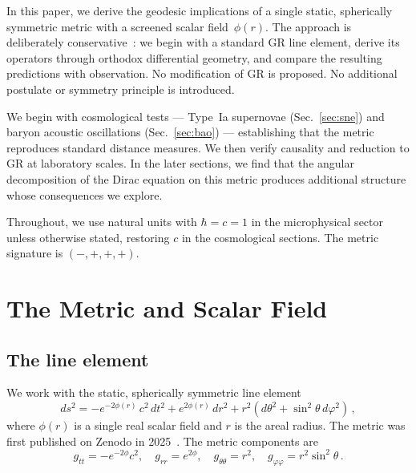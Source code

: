 \documentclass[aps,prd,twocolumn,superscriptaddress,nofootinbib,longbibliography]{revtex4-2}
\begin{document}
In this paper, we derive the geodesic implications of a single static,
spherically symmetric metric with a screened scalar field~$\phi(r)$.
The approach is deliberately conservative~\cite{Einstein1916,BransDicke1961,Fujii2003,Sotiriou2010}: we begin with a standard GR
line element, derive its operators through orthodox differential
geometry, and compare the resulting predictions with observation.  No
modification of GR is proposed.  No additional postulate or symmetry
principle is introduced.

We begin with cosmological tests --- Type~Ia supernovae
(Sec.~\ref{sec:sne}) and baryon acoustic oscillations
(Sec.~\ref{sec:bao}) --- establishing that the metric reproduces
standard distance measures.  We then verify causality and reduction to
GR at laboratory scales.  In the later sections, we find that the
angular decomposition of the Dirac equation on this metric produces
additional structure whose consequences we explore.

Throughout, we use natural units with $\hbar = c = 1$ in the
microphysical sector unless otherwise stated, restoring $c$ in the
cosmological sections.  The metric signature is $(-,+,+,+)$.

\section{The Metric and Scalar Field}\label{sec:metric}

\subsection{The line element}

We work with the static, spherically symmetric line element
\begin{equation}\label{eq:metric}
  ds^2 = -e^{-2\phi(r)}\,c^2\,dt^2 + e^{2\phi(r)}\,dr^2
         + r^2(d\theta^2 + \sin^2\!\theta\,d\varphi^2)\,,
\end{equation}
where $\phi(r)$ is a single real scalar field and $r$ is the areal
radius.  The metric was first published on Zenodo in
2025~\cite{zenodo2025}.  The metric components are
\begin{equation}
  g_{tt} = -e^{-2\phi}c^2,\quad g_{rr} = e^{2\phi},\quad
  g_{\theta\theta} = r^2,\quad g_{\varphi\varphi} = r^2\sin^2\theta\,.
\end{equation}
\end{document}

